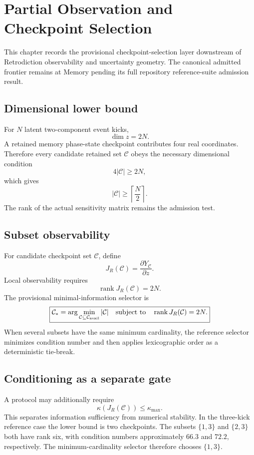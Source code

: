 
\chapter{Partial Observation and Checkpoint Selection}

This chapter records the provisional checkpoint-selection layer downstream of Retrodiction observability and uncertainty geometry. The canonical admitted frontier remains at Memory pending its full repository reference-suite admission result.

\section{Dimensional lower bound}

For \(N\) latent two-component event kicks,
\[
\dim z=2N.
\]
A retained memory phase-state checkpoint contributes four real coordinates. Therefore every candidate retained set \(\mathcal C\) obeys the necessary dimensional condition
\[
4|\mathcal C|\ge2N,
\]
which gives
\[
\boxed{
|\mathcal C|\ge\left\lceil\frac{N}{2}\right\rceil.
}
\]
The rank of the actual sensitivity matrix remains the admission test.

\section{Subset observability}

For candidate checkpoint set \(\mathcal C\), define
\[
J_R(\mathcal C)
=\frac{\partial Y_{\mathcal C}}{\partial z}.
\]
Local observability requires
\[
\boxed{
\operatorname{rank}J_R(\mathcal C)=2N.
}
\]
The provisional minimal-information selector is
\[
\boxed{
\mathcal C_*
=\arg\min_{\mathcal C\subseteq\mathcal C_{\rm avail}}
|\mathcal C|
\quad\text{subject to}\quad
\operatorname{rank}J_R(\mathcal C)=2N.
}
\]
When several subsets have the same minimum cardinality, the reference selector minimizes condition number and then applies lexicographic order as a deterministic tie-break.

\section{Conditioning as a separate gate}

A protocol may additionally require
\[
\boxed{
\kappa\!\left(J_R(\mathcal C)\right)\le\kappa_{\max}.
}
\]
This separates information sufficiency from numerical stability. In the three-kick reference case the lower bound is two checkpoints. The subsets \(\{1,3\}\) and \(\{2,3\}\) both have rank six, with condition numbers approximately \(66.3\) and \(72.2\), respectively. The minimum-cardinality selector therefore chooses \(\{1,3\}\).


